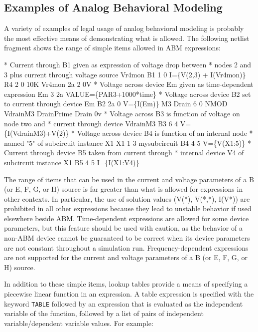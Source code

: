 \subsection{Examples of Analog Behavioral Modeling}
A variety of examples of legal usage of analog behavioral modeling is
probably the most effective means of demonstrating what is
allowed. The following netlist fragment shows the range of 
simple items allowed in ABM  expressions:

\begin{vquote}
\color{blue}* Current through B1 given as expression of voltage drop between 
* nodes 2 and 3 plus current through voltage source Vr4mon\color{black}
B1  1  0  I=\{V(2,3) + I(Vr4mon)\}
R4  2  0  10K
Vr4mon  2a 2  0V
\color{blue}* Voltage across device Em given as time-dependent expression \color{black}
Em  3  2a  VALUE=\{PAR3+1000*time\}
\color{blue}* Voltage across device B2 set to  current through device Em\color{black}
B2  2a  0  V=\{I(Em)\}
M3  Drain  6  0  NMOD
VdrainM3 DrainPrime Drain 0v
\color{blue}* Voltage across B3 is function of voltage on node two and 
* current through device VdrainM3\color{black}
B3  6  4  V=\{I(VdrainM3)+V(2)\}
\color{blue}* Voltage across device B4 is function of an internal node 
* named "5" of subcircuit instance X1\color{black}
X1 1 3 mysubcircuit
B4 4 5 V=\{V(X1:5)\}
\color{blue}* Current through device B5 taken from current through 
* internal device V4 of subcircuit instance X1\color{black}
B5 4 5 I=\{I(X1:V4)\}
\end{vquote}

The range of items that can be used in the current and voltage
parameters of a B (or E, F, G, or H) source is far greater than what
is allowed for expressions in other contexts. In particular, the use
of solution values (V(*), V(*,*), I(V*)) are prohibited in all other
expressions because they lead to unstable behavior if used
elsewhere beside ABM. Time-dependent expressions are allowed for some device
parameters, but this feature should be used with caution, as the
behavior of a non-ABM device cannot be guaranteed to be correct when its 
device parameters are not constant throughout a simulation run.
Frequency-dependent expressions are not supported for the current and voltage
parameters of a B (or E, F, G, or H) source.

In addition to these simple items, lookup tables provide a means of
specifying a piecewise linear function in an expression.  A table expression is
specified with the keyword \verb+TABLE+ followed by an expression that
is evaluated as the independent variable of the function, followed by a
list of pairs of independent variable/dependent variable values.  For
example:

